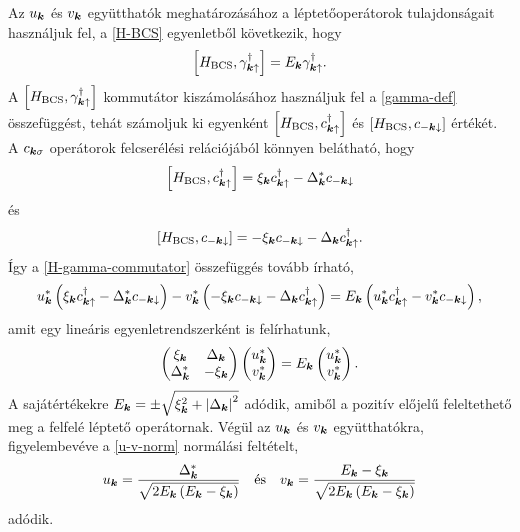 \documentclass[a4paper,12pt,titlepage]{article}
\newcommand{\KK}{{\vb*{k}}}
\begin{document}
Az $u_\KK$ és $v_\KK$ együtthatók meghatározásához a léptetőoperátorok tulajdonságait használjuk fel, a \eqref{H-BCS} egyenletből következik, hogy
\begin{equation} \label{H-gamma-commutator}
	\commutator{H_\text{BCS}}{\gamma_{\KK \uparrow}^\dagger} = E_\KK \gamma_{\KK \uparrow}^\dagger.
\end{equation}
A $\commutator{H_\text{BCS}}{\gamma_{\KK \uparrow}^\dagger}$ kommutátor kiszámolásához használjuk fel a \eqref{gamma-def} összefüggést, tehát számoljuk ki egyenként $\commutator{H_\text{BCS}}{c_{\KK \uparrow}^\dagger}$ és $\commutator{H_\text{BCS}}{c_{-\KK \downarrow}}$ értékét.  A $c_{\KK \sigma}$ operátorok felcserélési relációjából könnyen belátható, hogy
\begin{equation}
	\commutator{H_\text{BCS}}{c_{\KK \uparrow}^\dagger} = \xi_\KK c_{\KK \uparrow}^\dagger - \Delta_\KK^* c_{-\KK \downarrow}
\end{equation}
és
\begin{equation}
	\commutator{H_\text{BCS}}{c_{-\KK \downarrow}} = -\xi_\KK c_{-\KK \downarrow} - \Delta_\KK c_{\KK \uparrow}^\dagger.
\end{equation}
Így a \eqref{H-gamma-commutator} összefüggés tovább írható,
\begin{equation}
	u_\KK^* \left( \xi_\KK c_{\KK \uparrow}^\dagger - \Delta_\KK^* c_{-\KK \downarrow} \right) - v_\KK^* \left( -\xi_\KK c_{-\KK \downarrow} - \Delta_\KK c_{\KK \uparrow}^\dagger \right) = E_\KK \left( u_\KK^* c_{\KK \uparrow}^\dagger - v_\KK^* c_{-\KK \downarrow} \right),
\end{equation}
amit egy lineáris egyenletrendszerként is felírhatunk,
\begin{equation}
	\begin{pmatrix}
		\xi_\KK & \Delta_\KK \\
		\Delta_\KK^* & -\xi_\KK
	\end{pmatrix} \begin{pmatrix} u_\KK^* \\ v_\KK^* \end{pmatrix}
	= E_\KK \begin{pmatrix} u_\KK^* \\ v_\KK^* \end{pmatrix}.
\end{equation}
A sajátértékekre $E_\KK = \pm \sqrt{\xi_\KK^2 + \left| \Delta_\KK \right|^2}$ adódik, amiből a pozitív előjelű feleltethető meg a felfelé léptető operátornak.  Végül az $u_\KK$ és $v_\KK$ együtthatókra, figyelembevéve a \eqref{u-v-norm} normálási feltételt,
\begin{equation}
	u_\KK = \frac{\Delta_\KK^*}{\sqrt{2 E_\KK \left( E_\KK - \xi_\KK \right)}} ~~~ \text{és} ~~~ v_\KK = \frac{E_\KK - \xi_\KK}{\sqrt{2 E_\KK \left( E_\KK - \xi_\KK \right)}}
\end{equation}
adódik.
\end{document}
